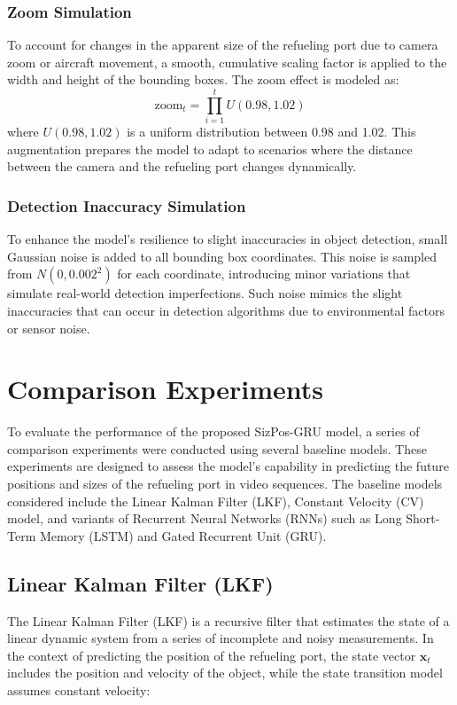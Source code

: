 \documentclass[12pt,oneside]{book} %
\begin{document}
\subsubsection*{Zoom Simulation}

\noindent To account for changes in the apparent size of the refueling port due to camera
zoom or aircraft movement, a smooth, cumulative scaling factor is applied to
the width and height of the bounding boxes. The zoom effect is modeled as:
\[
    \text{zoom}_t = \prod_{i=1}^t U(0.98, 1.02)
\]
where $U(0.98, 1.02)$ is a uniform distribution between 0.98 and 1.02. This
augmentation prepares the model to adapt to scenarios where the distance
between the camera and the refueling port changes dynamically.

\subsubsection*{Detection Inaccuracy Simulation}

\noindent To enhance the model's resilience to slight inaccuracies in object detection,
small Gaussian noise is added to all bounding box coordinates. This noise is
sampled from $N(0, 0.002^2)$ for each coordinate, introducing minor variations
that simulate real-world detection imperfections. Such noise mimics the slight
inaccuracies that can occur in detection algorithms due to environmental
factors or sensor noise.

\newpage
\section{Comparison Experiments}
To evaluate the performance of the proposed SizPos-GRU model, a series of
comparison experiments were conducted using several baseline models. These
experiments are designed to assess the model's capability in predicting the
future positions and sizes of the refueling port in video sequences. The
baseline models considered include the Linear Kalman Filter (LKF), Constant
Velocity (CV) model, and variants of Recurrent Neural Networks (RNNs) such as
Long Short-Term Memory (LSTM) and Gated Recurrent Unit (GRU).

\subsection*{Linear Kalman Filter (LKF)}
\noindent The Linear Kalman Filter (LKF) is a recursive filter that estimates the state
of a linear dynamic system from a series of incomplete and noisy measurements.
In the context of predicting the position of the refueling port, the state
vector $\mathbf{x}_t$ includes the position and velocity of the object, while
the state transition model assumes constant velocity:
\end{document}
